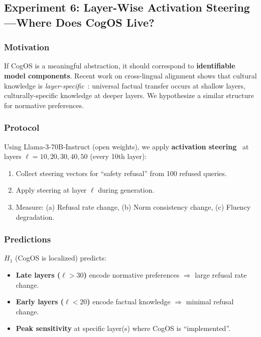 \documentclass[11pt]{article}
\begin{document}
\subsection{Experiment 6: Layer-Wise Activation Steering—Where Does CogOS Live?}

\subsubsection{Motivation}

If CogOS is a meaningful abstraction, it should correspond to \textbf{identifiable model components}. Recent work on cross-lingual alignment shows that cultural knowledge is \emph{layer-specific}~\citep{han2025cross}: universal factual transfer occurs at shallow layers, culturally-specific knowledge at deeper layers. We hypothesize a similar structure for normative preferences.

\subsubsection{Protocol}

Using Llama-3-70B-Instruct (open weights), we apply \textbf{activation steering}~\citep{turner2023activation} at layers $\ell = 10, 20, 30, 40, 50$ (every 10th layer):
\begin{enumerate}
    \item Collect steering vectors for ``safety refusal'' from 100 refused queries.
    \item Apply steering at layer $\ell$ during generation.
    \item Measure: (a) Refusal rate change, (b) Norm consistency change, (c) Fluency degradation.
\end{enumerate}

\subsubsection{Predictions}

$H_1$ (CogOS is localized) predicts:
\begin{itemize}
    \item \textbf{Late layers ($\ell > 30$)} encode normative preferences $\Rightarrow$ large refusal rate change.
    \item \textbf{Early layers ($\ell < 20$)} encode factual knowledge $\Rightarrow$ minimal refusal change.
    \item \textbf{Peak sensitivity} at specific layer(s) where CogOS is ``implemented''.
\end{itemize}
\end{document}
